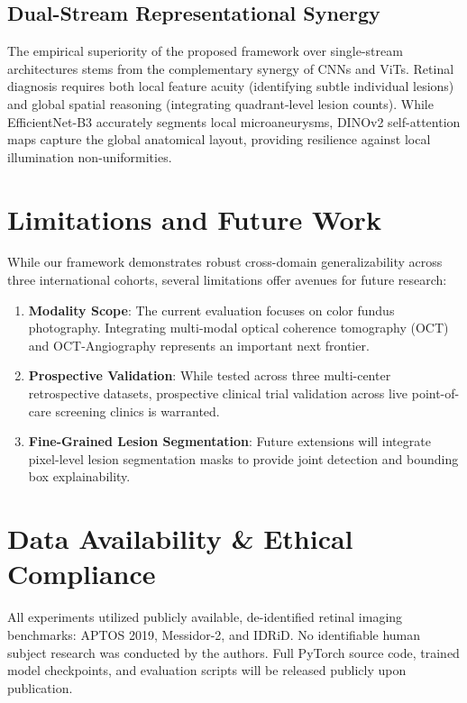 \documentclass[conference]{IEEEtran}
\begin{document}
\subsection{Dual-Stream Representational Synergy}
The empirical superiority of the proposed framework over single-stream architectures stems from the complementary synergy of CNNs and ViTs. Retinal diagnosis requires both local feature acuity (identifying subtle individual lesions) and global spatial reasoning (integrating quadrant-level lesion counts). While EfficientNet-B3 accurately segments local microaneurysms, DINOv2 self-attention maps capture the global anatomical layout, providing resilience against local illumination non-uniformities.

\section{Limitations and Future Work}
While our framework demonstrates robust cross-domain generalizability across three international cohorts, several limitations offer avenues for future research:
\begin{enumerate}
    \item \textbf{Modality Scope}: The current evaluation focuses on color fundus photography. Integrating multi-modal optical coherence tomography (OCT) and OCT-Angiography represents an important next frontier.
    \item \textbf{Prospective Validation}: While tested across three multi-center retrospective datasets, prospective clinical trial validation across live point-of-care screening clinics is warranted.
    \item \textbf{Fine-Grained Lesion Segmentation}: Future extensions will integrate pixel-level lesion segmentation masks to provide joint detection and bounding box explainability.
\end{enumerate}

\section{Data Availability \& Ethical Compliance}
All experiments utilized publicly available, de-identified retinal imaging benchmarks: APTOS 2019, Messidor-2, and IDRiD. No identifiable human subject research was conducted by the authors. Full PyTorch source code, trained model checkpoints, and evaluation scripts will be released publicly upon publication.
\end{document}

